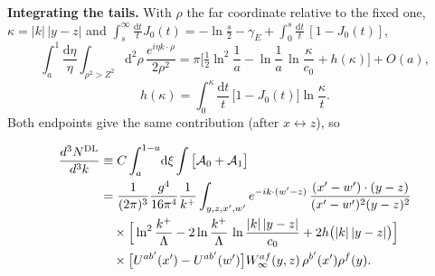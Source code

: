 \documentclass[11pt,a4paper]{article}
\newcommand{\dd}{\mathrm{d}}
\newcommand{\Winf}{W_\infty}
\begin{document}
\textbf{Integrating the tails.} With $\rho$ the far coordinate relative to the fixed one, $\kappa=|k|\,|y-z|$ and
$\int_{s}^{\infty}\frac{\dd t}{t}J_0(t)=-\ln\frac s2-\gamma_E+\int_0^s\frac{\dd t}{t}\,[1-J_0(t)]$,
\begin{equation}
\int_a^{1}\frac{\dd\eta}{\eta}\int_{\rho^2>Z^2}\!\dd^2\rho\,\frac{e^{i\eta k\cdot\rho}}{2\rho^2}
=\pi\Big[\tfrac12\ln^2\frac1a-\ln\frac1a\,\ln\frac{\kappa}{c_0}+h(\kappa)\Big]+O(a),
\label{eq:J}
\end{equation}
\begin{equation}
h(\kappa)=\int_0^\kappa\frac{\dd t}{t}\,\big[1-J_0(t)\big]\ln\frac\kappa t .
\end{equation}
Both endpoints give the same contribution (after $x\leftrightarrow z$), so
\begin{result}
\begin{align}
\frac{d^3N^{\rm DL}}{d^3k}&\equiv C\int_a^{1-a}\!\dd\xi\int\big[\mathcal A_0+\mathcal A_1\big]\notag\\
&=\frac{1}{(2\pi)^3}\frac{g^4}{16\pi^4}\frac1{k^+}\int_{y,z,x',w'}e^{-ik\cdot(w'-z)}\,
\frac{(x'-w')\cdot(y-z)}{(x'-w')^2(y-z)^2}\notag\\
&\quad\times\Big[\ln^2\frac{k^+}{\Lambda}-2\ln\frac{k^+}{\Lambda}\,\ln\frac{|k|\,|y-z|}{c_0}+2h\big(|k|\,|y-z|\big)\Big]\notag\\
&\quad\times\big[U^{ab'}(x')-U^{ab'}(w')\big]\Winf^{af}(y,z)\,\rho^{b'}(x')\rho^f(y).
\label{eq:DL}
\end{align}
\end{result}

\end{document}
